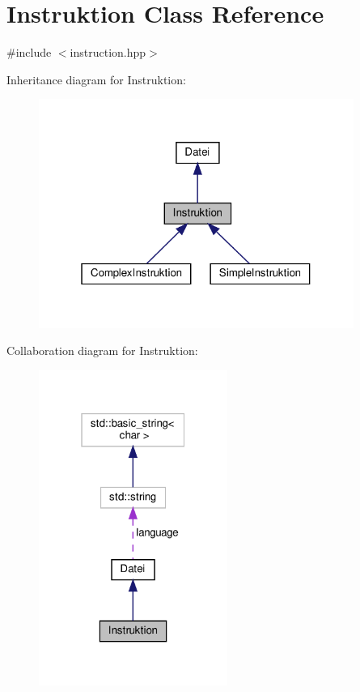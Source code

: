 \hypertarget{class_instruktion}{}\section{Instruktion Class Reference}
\label{class_instruktion}


{\ttfamily \#include $<$instruction.\+hpp$>$}



Inheritance diagram for Instruktion\+:
\nopagebreak
\begin{figure}[H]
\begin{center}
\leavevmode
\includegraphics[width=292pt]{class_instruktion__inherit__graph}
\end{center}
\end{figure}


Collaboration diagram for Instruktion\+:
\nopagebreak
\begin{figure}[H]
\begin{center}
\leavevmode
\includegraphics[width=175pt]{class_instruktion__coll__graph}
\end{center}
\end{figure}
